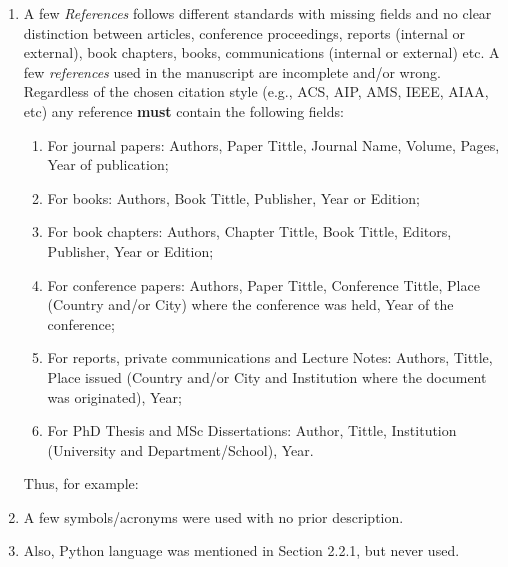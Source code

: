 \documentclass[14pt,twoside]{report}
\begin{document}
\begin{enumerate}
%
\item A few {\it References} follows different standards with missing fields and no clear distinction between articles, conference proceedings, reports (internal or external), book chapters, books, communications (internal or external) etc.  A few {\it references} used in the manuscript are incomplete and/or wrong. Regardless of the chosen citation style (e.g., ACS, AIP, AMS, IEEE, AIAA, etc) any reference {\bf must} contain the following fields: 
\begin{enumerate}
\item For journal papers: Authors, Paper Tittle, Journal Name, Volume, Pages, Year of publication;
\item For books: Authors, Book Tittle, Publisher, Year or Edition;
\item For book chapters: Authors, Chapter Tittle, Book Tittle, Editors, Publisher, Year or Edition;
\item For conference papers: Authors, Paper Tittle, Conference Tittle, Place (Country and/or City) where the conference was held, Year of the conference;
\item For reports,  private communications and Lecture Notes: Authors, Tittle, Place issued (Country and/or City and Institution where the document was originated), Year;
\item For PhD Thesis and MSc Dissertations: Author, Tittle, Institution (University and Department/School), Year.
\end{enumerate}  
Thus, for example:
%
\item A few symbols/acronyms were used with no prior description.
%
\item Also, Python language was mentioned in Section 2.2.1, but never used.
% 
\end{enumerate}
\end{document}
